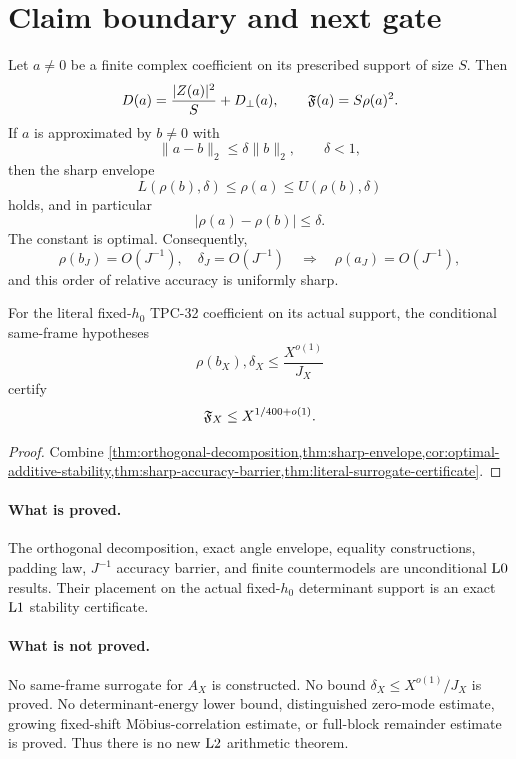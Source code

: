 \section{Claim boundary and next gate}
\label{sec:claim-boundary}

\begin{theorem}
\label{thm:audited-conclusion}
Let \(a\ne0\) be a finite complex coefficient on its prescribed
support of size \(S\).  Then
\[
 D(a)=\frac{|Z(a)|^2}{S}+D_\perp(a),\qquad
 \mathfrak F(a)=S\rho(a)^2.
\]
If \(a\) is approximated by \(b\ne0\) with
\[
 \|a-b\|_2\le\delta\|b\|_2,\qquad\delta<1,
\]
then the sharp envelope
\[
 L(\rho(b),\delta)\le\rho(a)\le
 U(\rho(b),\delta)
\]
holds, and in particular
\[
 |\rho(a)-\rho(b)|\le\delta.
\]
The constant is optimal.  Consequently,
\[
 \rho(b_J)=O(J^{-1}),\quad
 \delta_J=O(J^{-1})
\quad\Longrightarrow\quad
 \rho(a_J)=O(J^{-1}),
\]
and this order of relative accuracy is uniformly sharp.

For the literal fixed-\(h_0\) TPC-32 coefficient on its actual
support, the conditional same-frame hypotheses
\[
 \rho(b_X),\delta_X
 \le\frac{X^{o(1)}}{J_X}
\]
certify
\[
 \mathfrak F_X\le X^{1/400+o(1)}.
\]
\end{theorem}

\begin{proof}
Combine
\cref{thm:orthogonal-decomposition,thm:sharp-envelope,cor:optimal-additive-stability,thm:sharp-accuracy-barrier,thm:literal-surrogate-certificate}.
\end{proof}

\paragraph{What is proved.}
The orthogonal decomposition, exact angle envelope, equality
constructions, padding law, \(J^{-1}\) accuracy barrier, and finite
countermodels are unconditional \(\mathrm{L0}\) results.  Their placement
on the actual fixed-\(h_0\) determinant support is an exact
\(\mathrm{L1}\) stability certificate.

\paragraph{What is not proved.}
No same-frame surrogate for \(A_X\) is constructed.  No bound
\(\delta_X\le X^{o(1)}/J_X\) is proved.  No determinant-energy lower
bound, distinguished zero-mode estimate, growing fixed-shift
M{\"o}bius-correlation estimate, or full-block remainder estimate is
proved.  Thus there is no new \(\mathrm{L2}\) arithmetic theorem.

